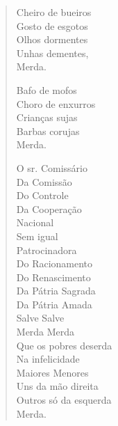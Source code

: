 {\begin{verse}
Cheiro de bueiros\\
Gosto de esgotos\\
Olhos dormentes\\
Unhas dementes,\\
\quad Merda.

Bafo de mofos\\
Choro de enxurros\\
Crianças sujas\\
Barbas corujas\\
\quad Merda.

O sr. Comissário\\
Da Comissão\\
Do Controle\\
Da Cooperação\\
Nacional\\
Sem igual\\
Patrocinadora\\
Do Racionamento\\
Do Renascimento\\
Da Pátria Sagrada\\
Da Pátria Amada\\
Salve Salve\\
Merda Merda\\
Que os pobres deserda\\
Na infelicidade\\
Maiores Menores\\
Uns da mão direita\\
Outros só da esquerda\\
\quad Merda.
\end{verse}

}
